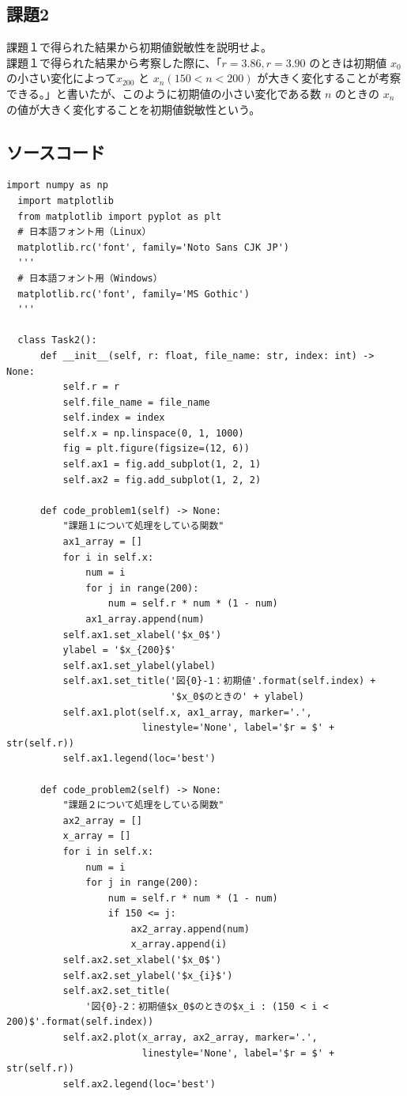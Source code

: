 \subsection{課題2}
課題１で得られた結果から初期値鋭敏性を説明せよ。\\
課題１で得られた結果から考察した際に、「$r = 3.86, r = 3.90$ のときは初期値 $x_0$ の小さい変化によって$x_{200}$ と $x_n (150 < n < 200)$ が大きく変化することが考察できる。」と書いたが、このように初期値の小さい変化である数 $n$ のときの $x_n$ の値が大きく変化することを初期値鋭敏性という。

\subsection{ソースコード}
\begin{lstlisting}[caption=week2.py]
  import numpy as np
  import matplotlib
  from matplotlib import pyplot as plt
  # 日本語フォント用（Linux）
  matplotlib.rc('font', family='Noto Sans CJK JP')
  '''
  # 日本語フォント用（Windows）
  matplotlib.rc('font', family='MS Gothic')
  '''
  
  class Task2():
      def __init__(self, r: float, file_name: str, index: int) -> None:
          self.r = r
          self.file_name = file_name
          self.index = index
          self.x = np.linspace(0, 1, 1000)
          fig = plt.figure(figsize=(12, 6))
          self.ax1 = fig.add_subplot(1, 2, 1)
          self.ax2 = fig.add_subplot(1, 2, 2)
  
      def code_problem1(self) -> None:
          "課題１について処理をしている関数"
          ax1_array = []
          for i in self.x:
              num = i
              for j in range(200):
                  num = self.r * num * (1 - num)
              ax1_array.append(num)
          self.ax1.set_xlabel('$x_0$')
          ylabel = '$x_{200}$'
          self.ax1.set_ylabel(ylabel)
          self.ax1.set_title('図{0}-1：初期値'.format(self.index) +
                             '$x_0$のときの' + ylabel)
          self.ax1.plot(self.x, ax1_array, marker='.',
                        linestyle='None', label='$r = $' + str(self.r))
          self.ax1.legend(loc='best')
  
      def code_problem2(self) -> None:
          "課題２について処理をしている関数"
          ax2_array = []
          x_array = []
          for i in self.x:
              num = i
              for j in range(200):
                  num = self.r * num * (1 - num)
                  if 150 <= j:
                      ax2_array.append(num)
                      x_array.append(i)
          self.ax2.set_xlabel('$x_0$')
          self.ax2.set_ylabel('$x_{i}$')
          self.ax2.set_title(
              '図{0}-2：初期値$x_0$のときの$x_i : (150 < i < 200)$'.format(self.index))
          self.ax2.plot(x_array, ax2_array, marker='.',
                        linestyle='None', label='$r = $' + str(self.r))
          self.ax2.legend(loc='best')
  

\end{lstlisting}
